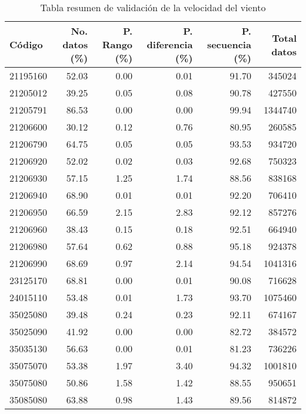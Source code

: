 \documentclass[11pt]{article}
\begin{document}
\begin{table}[H]
\begin{center}


\begin{tabular}{lrrrrr}
\toprule
      Código &  No. datos  (\%)&  P. Rango  (\%)&  P. diferencia  (\%)&  P. secuencia  (\%)& Total datos \\
\midrule
 21195160 &      52.03 &      0.00 &           0.01 &         91.70 &        345024 \\
 21205012 &      39.25 &      0.05 &           0.08 &         90.78 &        427550 \\
 21205791 &      86.53 &      0.00 &           0.00 &         99.94 &       1344740 \\
 21206600 &      30.12 &      0.12 &           0.76 &         80.95 &        260585 \\
 21206790 &      64.75 &      0.05 &           0.05 &         93.53 &        934720 \\
 21206920 &      52.02 &      0.02 &           0.03 &         92.68 &        750323 \\
 21206930 &      57.15 &      1.25 &           1.74 &         88.56 &        838168 \\
 21206940 &      68.90 &      0.01 &           0.01 &         92.20 &        706410 \\
 21206950 &      66.59 &      2.15 &           2.83 &         92.12 &        857276 \\
 21206960 &      38.43 &      0.15 &           0.18 &         92.51 &        664940 \\
 21206980 &      57.64 &      0.62 &           0.88 &         95.18 &        924378 \\
 21206990 &      68.69 &      0.97 &           2.14 &         94.54 &       1041316 \\
 23125170 &      68.81 &      0.00 &           0.01 &         90.08 &        716628 \\
 24015110 &      53.48 &      0.01 &           1.73 &         93.70 &       1075460 \\
 35025080 &      39.48 &      0.24 &           0.23 &         92.11 &        674167 \\
 35025090 &      41.92 &      0.00 &           0.00 &         82.72 &        384572 \\
 35035130 &      56.63 &      0.00 &           0.01 &         81.23 &        736226 \\
 35075070 &      53.38 &      1.97 &           3.40 &         94.32 &       1001810 \\
 35075080 &      50.86 &      1.58 &           1.42 &         88.55 &        950651 \\
 35085080 &      63.88 &      0.98 &           1.43 &         89.56 &        814872 \\
\bottomrule
\end{tabular}
		\caption{Tabla resumen de validación de la velocidad del viento}
		\label{tabla:val_vel_viento}
\end{center}
\end{table}
\end{document}
